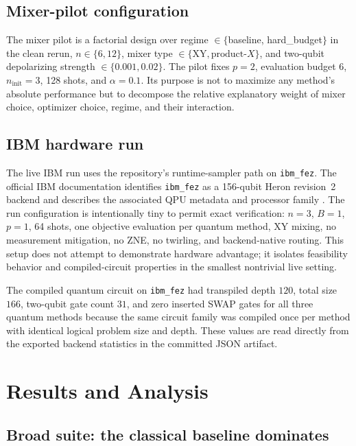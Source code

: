 \documentclass[11pt]{article}
\begin{document}
\subsection{Mixer-pilot configuration}

The mixer pilot is a factorial design over regime \(\in\{\)baseline, hard\_budget\(\}\) in the clean rerun, \(n \in \{6,12\}\), mixer type \(\in\{\mathrm{XY}, \mathrm{product}\text{-}X\}\), and two-qubit depolarizing strength \(\in \{0.001,0.02\}\). The pilot fixes \(p=2\), evaluation budget \(6\), \(n_{\mathrm{init}}=3\), 128 shots, and \(\alpha=0.1\). Its purpose is not to maximize any method's absolute performance but to decompose the relative explanatory weight of mixer choice, optimizer choice, regime, and their interaction.

\subsection{IBM hardware run}

The live IBM run uses the repository's runtime-sampler path on \texttt{ibm\_fez}. The official IBM documentation identifies \texttt{ibm\_fez} as a 156-qubit Heron revision~2 backend and describes the associated QPU metadata and processor family \cite{ibm2026qpuinfo,ibm2026processortypes,ibm2026hardware}. The run configuration is intentionally tiny to permit exact verification: \(n=3\), \(B=1\), \(p=1\), 64 shots, one objective evaluation per quantum method, \(\mathrm{XY}\) mixing, no measurement mitigation, no ZNE, no twirling, and backend-native routing. This setup does not attempt to demonstrate hardware advantage; it isolates feasibility behavior and compiled-circuit properties in the smallest nontrivial live setting.

The compiled quantum circuit on \texttt{ibm\_fez} had transpiled depth \(120\), total size \(166\), two-qubit gate count \(31\), and zero inserted SWAP gates for all three quantum methods because the same circuit family was compiled once per method with identical logical problem size and depth. These values are read directly from the exported backend statistics in the committed JSON artifact.

\section{Results and Analysis}\label{sec:results}

\subsection{Broad suite: the classical baseline dominates}
\end{document}
